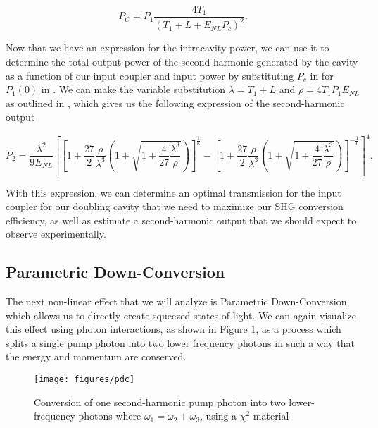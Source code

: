 \begin{equation}
  \label{eq:p_inner_simp}
  P_C = P_1 \frac{4T_1}{(T_1 + L + E_{NL}P_c)^2} .
\end{equation}

\noindent
Now that we have an expression for the intracavity power, we can use it to determine the total output power of the second-harmonic generated by the cavity as a function of our input coupler and input power by substituting $P_c$ in for $P_1(0)$ in .  We can make the variable substitution $\lambda = T_1 + L$ and $\rho = 4T_1 P_1 E_{NL}$ as outlined in \cite{SoerensenPhD}, which gives us the following expression of the second-harmonic output  

\begin{equation}
  P_2 = \frac{\lambda^2}{9 E_{NL}} \left[\left[1+\frac{27}{2}
\frac{\rho}{\lambda^3}\left(1+\sqrt{1+\frac{4}{27}\frac{\lambda^3}{\rho}}\right)\right]^{\frac{1}{6}}-\left[
1+\frac{27}{2}
\frac{\rho}{\lambda^3}\left(1+\sqrt{1+\frac{4}{27}\frac{\lambda^3}{\rho}}\right)\right]^{-\frac{1}{6}}\right]^4
.
\label{eq:sorenson}
\end{equation}

\noindent
With this expression, we can determine an optimal transmission for the input
coupler for our doubling cavity that we need to maximize our SHG conversion
efficiency, as well as estimate a second-harmonic output that we should expect
to observe experimentally.  



\subsection{Parametric Down-Conversion}
\label{parametric_down_conversion} 

The next non-linear effect that we will analyze is Parametric Down-Conversion,
which allows us to directly create squeezed states of light.  We can again
visualize this effect using photon interactions, as shown in Figure
\ref{fig:pdc_photon}, as a process which splits a single pump photon into two lower frequency photons in such a way that the energy and momentum are conserved.
    
\begin{figure}[!ht] 
 \centering 
 \texttt{[image: figures/pdc]} 
 \caption[Photon model of parametric down-conversion]{Conversion of one second-harmonic pump photon into two lower-frequency photons where $\omega_1 = \omega_2 + \omega_3 $, using a $\chi^2$ material }  
 \label{fig:pdc_photon}  
\end{figure}

